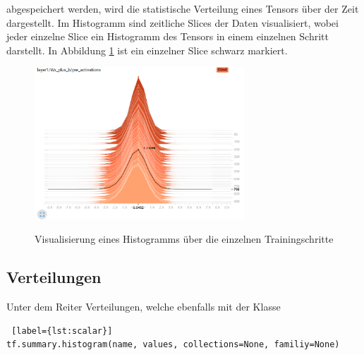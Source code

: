 abgespeichert werden, wird die statistische Verteilung eines Tensors über der Zeit dargestellt. Im Histogramm sind zeitliche \dq Slices\grqq{} der Daten visualisiert, wobei jeder einzelne Slice ein Histogramm des Tensors in einem einzelnen Schritt darstellt. In Abbildung \ref{fig:histogram} ist ein einzelner Slice schwarz markiert. \cite{tensorboard.2017}

\vspace{0.6cm}
\begin{figure}[h!]
	\centering
	 \includegraphics[width=0.7\textwidth]{images/Kapitel_3/histogram.png}\\
	\vspace{10pt} 
	\caption[Visualisierung eines Histogramms über die einzelnen Trainingsschritte]{Visualisierung eines Histogramms über die einzelnen Trainingschritte}
	\label{fig:histogram}
\end{figure}






\subsection{Verteilungen}
\vspace{10pt}

Unter dem Reiter Verteilungen, welche ebenfalls mit der Klasse
\\

\begin{minipage}{\linewidth}
\begin{lstlisting} [label={lst:scalar}]
tf.summary.histogram(name, values, collections=None, familiy=None)
\end{lstlisting}
\end{minipage}
\vspace{0.2cm}

